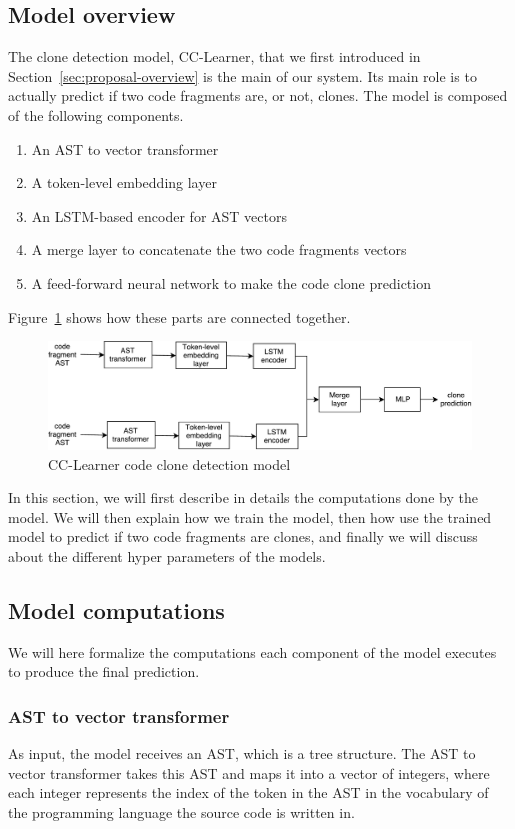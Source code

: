\subsection{Model overview}
The clone detection model, CC-Learner, that we first introduced in
Section~\ref{sec:proposal-overview} is the main of our system. Its main role is
to actually predict if two code fragments are, or not, clones. The model is
composed of the following components.
\begin{enumerate}
\item An AST to vector transformer
\item A token-level embedding layer
\item An LSTM-based encoder for AST vectors
\item A merge layer to concatenate the two code fragments vectors
\item A feed-forward neural network to make the code clone prediction
\end{enumerate}
%
Figure~\ref{fig:clone-detection-model} shows how these parts are connected
together.
%
\begin{figure}
  \centering\includegraphics[width=16cm]{./images/model-overview.pdf}
  \caption{\label{fig:clone-detection-model}CC-Learner code clone detection model}
\end{figure}
%
In this section, we will first describe in details the computations done by the
model. We will then explain how we train the model, then how use the trained
model to predict if two code fragments are clones, and finally we will discuss
about the different hyper parameters of the models.
%
\subsection{Model computations}
We will here formalize the computations each component of the model executes to
produce the final prediction.
\subsubsection{AST to vector transformer}
As input, the model receives an AST, which is a tree structure. The AST to
vector transformer takes this AST and maps it into a vector of integers, where
each integer represents the index of the token in the AST in the vocabulary of
the programming language the source code is written in.

